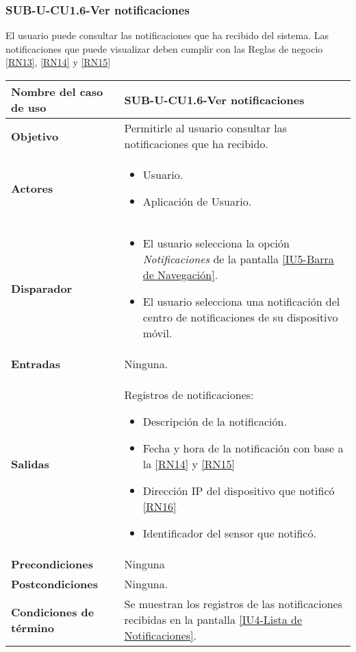 
\subsubsection{SUB-U-CU1.6-Ver notificaciones}\label{SUB-U-CU1.6}
El usuario puede consultar las notificaciones que ha recibido del sistema. Las notificaciones que puede visualizar deben cumplir con las Reglas de negocio \ref{RN13}, \ref{RN14} y \ref{RN15}

\begin{longtable}{|J{5cm}|J{10.3cm}|}
	\hline
	\textbf{Nombre del caso de uso} &
		SUB-U-CU1.6-Ver notificaciones \\ \hline
	\textbf{Objetivo} &
		Permitirle al usuario consultar las notificaciones que ha recibido. \\ \hline
	\textbf{Actores} &
	    \begin{itemize}
		    \item Usuario. 
		    \item Aplicación de Usuario.
		\end{itemize}
		    \\ \hline 
	\textbf{Disparador} & 
		\begin{itemize}
		    \item El usuario selecciona la opción \textit{Notificaciones} de la pantalla \hyperref[fig:Barra de navegacion]{[IU5-Barra de Navegación]}.
		    \item El usuario selecciona una notificación del centro de notificaciones de su dispositivo móvil.
		 \end{itemize}
		 \\ \hline 
	\textbf{Entradas} & Ninguna.
		\\ \hline 
	\textbf{Salidas} & 
	    Registros de notificaciones:
		\begin{itemize}
			\item Descripción de la notificación.
			\item Fecha y hora de la notificación con base a la \ref{RN14} y \ref{RN15}
			\item Dirección IP del dispositivo que notificó \ref{RN16}
			\item Identificador del sensor que notificó.
		\end{itemize} 
		\\ \hline
	\textbf{Precondiciones} &
	    Ninguna
		\\ \hline
	\textbf{Postcondiciones} & Ninguna.
		\\ \hline
	\textbf{Condiciones de término} & Se muestran los registros de las notificaciones recibidas en la pantalla \hyperref[fig:Lista de Notificaciones]{[IU4-Lista de Notificaciones]}.

\end{longtable}
